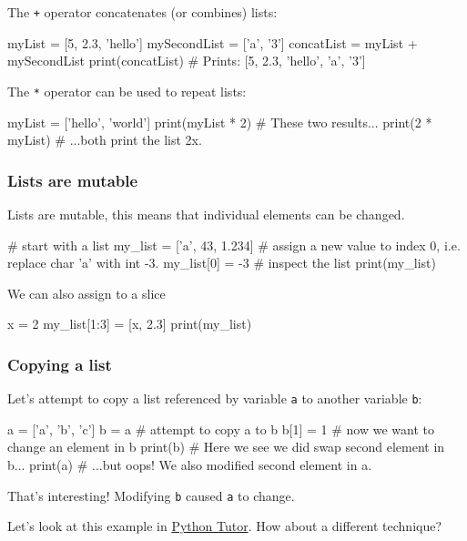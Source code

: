 \documentclass[12pt]{article} \newif\ifsolution\solutiontrue %
\begin{document}
The \texttt{+} operator concatenates (or combines) lists:

\begin{python}
myList = [5, 2.3, 'hello']
mySecondList = ['a', '3']
concatList = myList + mySecondList
print(concatList)  # Prints: [5, 2.3, 'hello', 'a', '3']
\end{python}

The \texttt{*} operator can be used to repeat lists:

\begin{python}
myList = ['hello', 'world']
print(myList * 2)  # These two results...
print(2 * myList)  # ...both print the list 2x.
\end{python}

\subsubsection{Lists are mutable}\label{lists-are-mutable}

Lists are mutable, this means that individual elements can be changed.

\begin{python}
# start with a list
my_list = ['a', 43, 1.234]
# assign a new value to index 0, i.e. replace char 'a' with int -3.
my_list[0] = -3
# inspect the list
print(my_list)
\end{python}

We can also assign to a slice

\begin{python}
x = 2
my_list[1:3] = [x, 2.3]
print(my_list)
\end{python}

\subsubsection{Copying a list}\label{copying-a-list}

Let's attempt to copy a list referenced by variable \texttt{a} to
another variable \texttt{b}:

\begin{python}
a = ['a', 'b', 'c']
b = a     # attempt to copy a to b
b[1] = 1  # now we want to change an element in b
print(b)  # Here we see we did swap second element in b...
print(a)  # ...but oops! We also modified second element in a.
\end{python}

That's interesting! Modifying \texttt{b} caused \texttt{a} to change.

Let's look at this example in
\href{http://pythontutor.com/iframe-embed.html\#code=a+\%3D+\%5B'a',+'b',+'c'\%5D\%0Ab+\%3D+a+\%23+attempt+to+copy+a+to+b\%0Ab\%5B1\%5D+\%3D+1+\%23+now+we+want+to+change+an+element+in+b\%0Aprint(b\%29\%0Aprint(a\%29\%0A\&origin=opt-frontend.js\&cumulative=false\&heapPrimitives=false\&textReferences=false\&py=3\&rawInputLstJSON=\%5B\%5D\&curInstr=0\&codeDivWidth=350\&codeDivHeight=400}{Python
Tutor}. How about a different technique?
\end{document}
